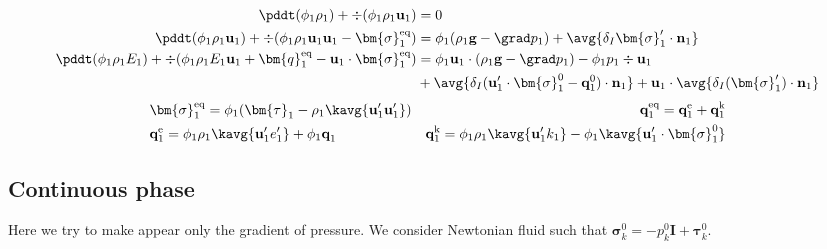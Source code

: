 \begin{align}
    \label{eq:dt_&vg_rho}
    \pddt (\phi_1 \rho_1)  
    + \div (
        \phi_1 \rho_1\textbf{u}_1
    )
    &= 
    0\\
    \label{eq:dt_&vg_rhou_1}
    \pddt (\phi_1 \rho_1\textbf{u}_1)  
    + \div (
        \phi_1 \rho_1\textbf{u}_1\textbf{u}_1
        - \bm{\sigma}_1^\text{eq}
    )
    &= 
    \phi_1  (\rho_1\textbf{g} - \grad p_1 )
    +  \avg{\delta_I \bm{\sigma}_1' \cdot \textbf{n}_1}\\
    \label{eq:dt_&vg_rhoE_1}
    \pddt (\phi_1\rho_1E_1)  
    + \div (
        \phi_1\rho_1E_1\textbf{u}_1
        + \bm{q}_1^\text{eq}
        - \textbf{u}_1 \cdot \bm{\sigma}_1^\text{eq}
        )
    &= 
    \phi_1 \textbf{u}_1 \cdot (\rho_1\textbf{g}
    - \grad p_1 
    )
    - \phi_1 p_1 \div \textbf{u}_1\\
    &+ \avg{\delta_I (\textbf{u}_1' \cdot \bm{\sigma}_1^0 
    - \textbf{q}_1^0)\cdot \textbf{n}_1}
    + \textbf{u}_1 \cdot \avg{\delta_I ( \bm{\sigma}_1')\cdot \textbf{n}_1}
\end{align} 
\begin{align*}
    &\bm{\sigma}_1^\text{eq}
    = \phi_1 (
        \bm{\tau}_1%
        - \rho_1\kavg{\textbf{u}_1'\textbf{u}_1'})  
    &\textbf{q}_1^\text{eq}
    =\textbf{q}_1^\text{e} 
    +\textbf{q}_1^\text{k}  \\
    &\textbf{q}_1^\text{e}
    = \phi_1\rho_1 \kavg{\textbf{u}_1' e_1'} 
    + \phi_1\textbf{q}_1 
    &\textbf{q}_1^\text{k}
    = \phi_1\rho_1 \kavg{\textbf{u}_1' k_1} 
    - \phi_1\kavg{\textbf{u}_1' \cdot \bm{\sigma}_1^0}
\end{align*}




\subsection{Continuous phase}
Here we try to make appear only the gradient of pressure. 
We consider Newtonian fluid such that $\bm{\sigma}_k^0 = -p^0_k \textbf{I} + \bm{\tau}_k^0$. 

